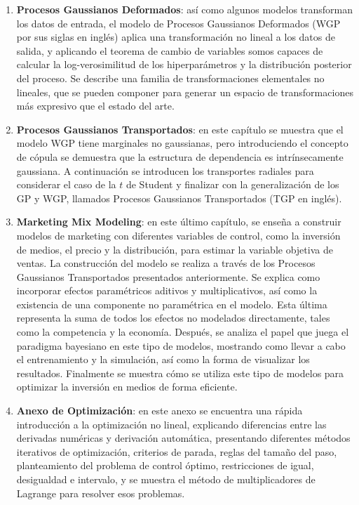 \begin{enumerate}
	\item \textbf{Procesos Gaussianos Deformados}: así como algunos modelos transforman los datos de entrada, el modelo de Procesos Gaussianos Deformados (WGP por sus siglas en inglés) aplica una transformación no lineal a los datos de salida, y aplicando el teorema de cambio de variables somos capaces de calcular la log-verosimilitud de los hiperparámetros y la distribución posterior del proceso. Se describe una familia de transformaciones elementales no lineales, que se pueden componer para generar un espacio de transformaciones más expresivo que el estado del arte.
	
	\item \textbf{Procesos Gaussianos Transportados}: en este capítulo se muestra que el modelo WGP tiene marginales no gaussianas, pero introduciendo el concepto de cópula se demuestra que la estructura de dependencia es intrínsecamente gaussiana. A continuación se introducen los transportes radiales para considerar el caso de la \(t\) de Student y finalizar con la generalización de los GP y WGP, llamados Procesos Gaussianos Transportados (TGP en inglés).
	
	\item \textbf{Marketing Mix Modeling}: en este último capítulo, se enseña a construir modelos de marketing con diferentes variables de control, como la inversión de medios, el precio y la distribución, para estimar la variable objetiva de ventas. La construcción del modelo se realiza a través de los Procesos Gaussianos Transportados presentados anteriormente. Se explica como incorporar efectos paramétricos aditivos y multiplicativos, así como la existencia de una componente no paramétrica en el modelo. Esta última representa la suma de todos los efectos no modelados directamente, tales como la competencia y la economía. Después, se analiza el papel que juega el paradigma bayesiano en este tipo de modelos, mostrando como llevar a cabo el entrenamiento y la simulación, así como la forma de visualizar los resultados. Finalmente se muestra cómo se utiliza este tipo de modelos para optimizar la inversión en medios de forma eficiente.
	
	\item \textbf{Anexo de Optimización}: en este anexo se encuentra una rápida introducción a la optimización no lineal, explicando diferencias entre las derivadas numéricas y derivación automática, presentando diferentes métodos iterativos de optimización, criterios de parada, reglas del tamaño del paso, planteamiento del problema de control óptimo, restricciones de igual, desigualdad e intervalo, y se muestra el método de multiplicadores de Lagrange para resolver esos problemas.
\end{enumerate}

